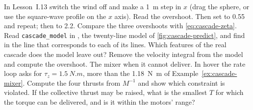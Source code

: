 \begin{exercises}
\exercise[2] In Lesson~I.13 switch the wind off and make a \SI{1}{m} step in $x$ (drag the sphere, or use the square-wave profile on the $x$ axis). Read the overshoot. Then set  to 0.55 and repeat; then to 2.2. Compare the three overshoots with \cref{eq:cascade-zeta}.
\exercise[2] Read \texttt{cascade\_model} in , the twenty-line model of \cref{fig:cascade-predict}, and find in  the line that corresponds to each of its lines. Which features of the real cascade does the model leave out? Remove the velocity integral from the model and compute the overshoot.
\exercise[3] The mixer when it cannot deliver. In hover the rate loop asks for $\tau_z = \SI{1.5}{N.m}$, more than the \SI{1.18}{N.m} of Example~\ref{ex:cascade-mixer}. Compute the four thrusts from $M^{-1}$ and show which constraint is violated. If the collective thrust may be raised, what is the smallest $T$ for which the torque can be delivered, and is it within the motors' range?
\end{exercises}
